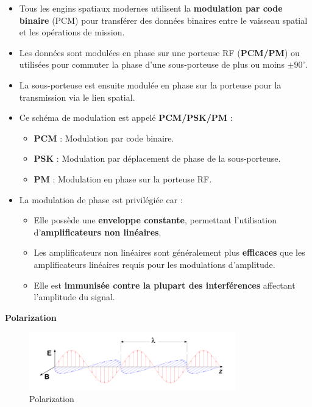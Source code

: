 \begin{itemize}
    \item Tous les engins spatiaux modernes utilisent la \textbf{modulation par code binaire} (PCM) pour transférer des données binaires entre le vaisseau spatial et les opérations de mission.
    \item Les données sont modulées en phase sur une porteuse RF (\textbf{PCM/PM}) ou utilisées pour commuter la phase d'une sous-porteuse de plus ou moins \(\pm 90^\circ\).
    \item La sous-porteuse est ensuite modulée en phase sur la porteuse pour la transmission via le lien spatial.
    \item Ce schéma de modulation est appelé \textbf{PCM/PSK/PM} :
    \begin{itemize}
        \item \textbf{PCM} : Modulation par code binaire.
        \item \textbf{PSK} : Modulation par déplacement de phase de la sous-porteuse.
        \item \textbf{PM} : Modulation en phase sur la porteuse RF.
    \end{itemize}
    \item La modulation de phase est privilégiée car :
    \begin{itemize}
        \item Elle possède une \textbf{enveloppe constante}, permettant l'utilisation d'\textbf{amplificateurs non linéaires}.
        \item Les amplificateurs non linéaires sont généralement plus \textbf{efficaces} que les amplificateurs linéaires requis pour les modulations d'amplitude.
        \item Elle est \textbf{immunisée contre la plupart des interférences} affectant l'amplitude du signal.
    \end{itemize}
\end{itemize}
\textbf{Polarization}
\begin{figure}[H] %
    \centering
    \includegraphics[width=0.8\textwidth]{figures/6-46.png}
    \caption{Polarization}
    \label{fig:communication2}
\end{figure}
